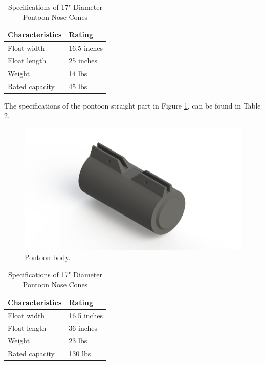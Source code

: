 \begin{table}[H]
\caption{Specifications of 17" Diameter Pontoon Nose Cones} %
\centering %
\renewcommand{\arraystretch}{0.8}
\begin{tabular}{l l}
\hline
\textbf{Characteristics} & \textbf{Rating} \\ 
\hline %
Float width & 16.5 inches \\
Float length & 25 inches \\
Weight & 14 lbs \\
Rated capacity & 45 lbs \\
\hline
\end{tabular}
\label{table:02nose-cone} %
\end{table}

The specifications of the pontoon straight part in Figure \ref{fig:02pontoon-body}, can be found in Table \ref{table:02pontoon-body}.

\begin{figure}[H]
    \centering
    \includegraphics[width=.8\textwidth]{images/02pontoon-body.png}
    \caption{Pontoon body.}
    \label{fig:02pontoon-body}
\end{figure}

\begin{table}[H]
\caption{Specifications of 17" Diameter Pontoon Nose Cones} %
\centering %
\renewcommand{\arraystretch}{0.8}
\begin{tabular}{l l}
\hline
\textbf{Characteristics} & \textbf{Rating} \\ 
\hline %
Float width & 16.5 inches \\
Float length & 36 inches \\
Weight & 23 lbs \\
Rated capacity & 130 lbs \\
\hline
\end{tabular}
\label{table:02pontoon-body} %
\end{table}


